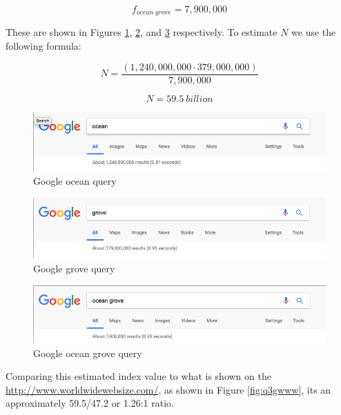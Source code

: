 \documentclass[letterpaper,11pt]{article}
\begin{document}
\begin{equation*}
	f_{ocean\ grove} = 7,900,000
\end{equation*}

These are shown in Figures \ref{fig:q3g1}, \ref{fig:q3g2}, and \ref{fig:q3g3} respectively. To estimate $N$ we use the following formula:

\begin{equation*}
	N = \frac{(1,240,000,000 \cdot 379,000,000)}{7,900,000}
\end{equation*}

\begin{equation*}
	N = 59.5 \ billion
\end{equation*}

\begin{figure}[h]
\centering
\includegraphics[scale=0.4]{google1.png}
\caption{Google ocean query}
\label{fig:q3g1}
\end{figure}

\begin{figure}[h]
\centering
\includegraphics[scale=0.4]{google2.png}
\caption{Google grove query}
\label{fig:q3g2}
\end{figure}

\begin{figure}[h]
\centering
\includegraphics[scale=0.4]{google3.png}
\caption{Google ocean grove query}
\label{fig:q3g3}
\end{figure}

\clearpage

Comparing this estimated index value to what is shown on the \url{http://www.worldwidewebsize.com/}, as shown in Figure \ref{fig:q3gwww}, its an approximately 59.5/47.2 or 
1.26:1 ratio.
\end{document}
